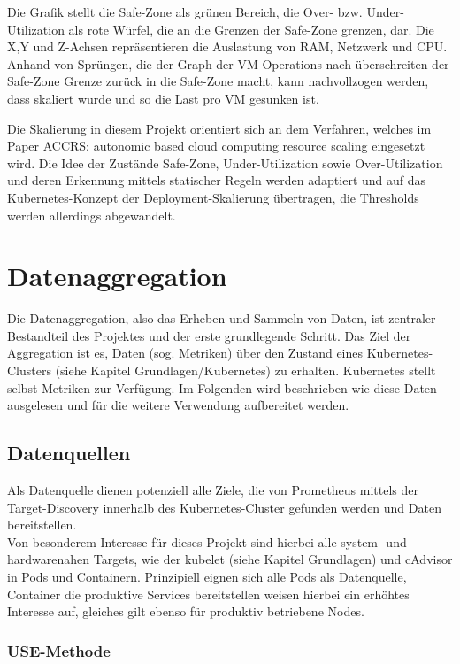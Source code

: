 \documentclass[a4paper,10pt]{scrartcl}
\begin{document}
Die Grafik stellt die Safe-Zone als grünen Bereich, die Over- bzw. Under-Utilization als rote Würfel, die an die Grenzen der Safe-Zone grenzen, dar. Die X,Y und Z-Achsen repräsentieren die Auslastung von RAM, Netzwerk und CPU. Anhand von Sprüngen, die der Graph der VM-Operations nach überschreiten der Safe-Zone Grenze zurück in die Safe-Zone macht, kann nachvollzogen werden, dass skaliert wurde und so die Last pro VM gesunken ist.

Die Skalierung in diesem Projekt orientiert sich an dem Verfahren, welches im Paper \glqq ACCRS: autonomic based cloud computing resource scaling\grqq \cite{AlSharif.2016} eingesetzt wird. Die Idee der Zustände Safe-Zone, Under-Utilization sowie Over-Utilization und deren Erkennung mittels statischer Regeln werden adaptiert und auf das Kubernetes-Konzept der Deployment-Skalierung übertragen, die Thresholds werden allerdings abgewandelt. 


\pagebreak
\section{Datenaggregation}

Die Datenaggregation, also das Erheben und Sammeln von Daten, ist zentraler Bestandteil des Projektes und der erste grundlegende Schritt. Das Ziel der Aggregation ist es, Daten (sog. Metriken) über den Zustand eines Kubernetes-Clusters (siehe Kapitel Grundlagen/Kubernetes) zu erhalten. Kubernetes stellt selbst Metriken zur Verfügung. Im Folgenden wird beschrieben wie diese Daten ausgelesen und für die weitere Verwendung aufbereitet werden.

\subsection{Datenquellen}

Als Datenquelle dienen potenziell alle Ziele, die von Prometheus mittels der Target-Discovery innerhalb des Kubernetes-Cluster gefunden werden und Daten bereitstellen.\\
Von besonderem Interesse für dieses Projekt sind hierbei alle system- und hardwarenahen Targets, wie der kubelet (siehe Kapitel Grundlagen) und cAdvisor in Pods und Containern.
Prinzipiell eignen sich alle Pods als Datenquelle, Container die produktive Services bereitstellen weisen hierbei ein erhöhtes Interesse auf, gleiches gilt ebenso für produktiv betriebene Nodes.

\subsubsection{\glqq USE\grqq-Methode}
\end{document}
